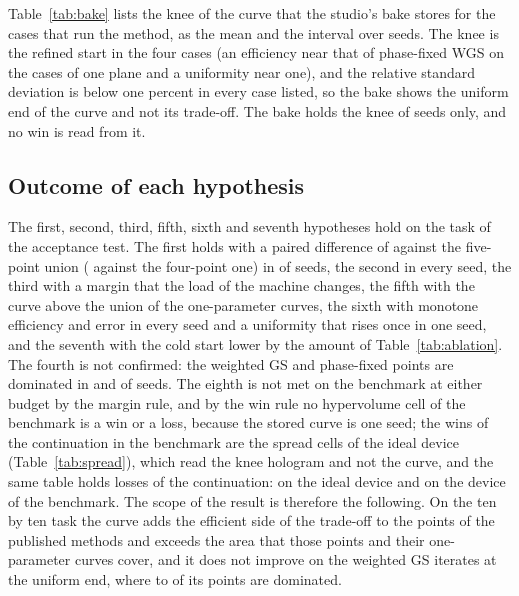 Table~\ref{tab:bake} lists the knee of the curve that the studio's bake stores for the cases that run the method, as the mean and the interval over \bakeSeeds{} seeds. The knee is the refined start in the four cases (an efficiency near that of phase-fixed WGS on the cases of one plane and a uniformity near one), and the relative standard deviation is below one percent in every case listed, so the bake shows the uniform end of the curve and not its trade-off. The bake holds the knee of \bakeSeeds{} seeds only, and no win is read from it.

\begin{table}[t]
\centering\small
\caption{Knee of the curve stored by the studio's bake for the cases that run the method: efficiency, uniformity and relative standard deviation (mean $\pm$ half-width of the 95 percent interval over \bakeSeeds{} seeds; the intervals are wide with three seeds). Source: the committed file of measured ranges.}
\label{tab:bake}

\end{table}

\subsection{Outcome of each hypothesis}\label{sec:res-outcome}

The first, second, third, fifth, sixth and seventh hypotheses hold on the task of the acceptance test. The first holds with a paired difference of \hvFiveDiff{} against the five-point union (\hvDiff{} against the four-point one) in \hvFiveGe{} of \nSeeds{} seeds, the second in every seed, the third with a margin that the load of the machine changes, the fifth with the curve above the union of the one-parameter curves, the sixth with monotone efficiency and error in every seed and a uniformity that rises once in one seed, and the seventh with the cold start lower by the amount of Table~\ref{tab:ablation}.
The fourth is not confirmed: the weighted GS and phase-fixed points are dominated in \domGSWSeeds{} and \domPFSeeds{} of \nSeeds{} seeds. The eighth is not met on the benchmark at either budget by the margin rule, and by the win rule no hypervolume cell of the benchmark is a win or a loss, because the stored curve is one seed; the wins of the continuation in the benchmark are the \spreadWins{} spread cells of the ideal device (Table~\ref{tab:spread}), which read the knee hologram and not the curve, and the same table holds losses of the continuation: \spreadLosses{} on the ideal device and \spreadDevLosses{} on the device of the benchmark. The scope of the result is therefore the following. On the ten by ten task the curve adds the efficient side of the trade-off to the points of the published methods and exceeds the area that those points and their one-parameter curves cover, and it does not improve on the weighted GS iterates at the uniform end, where
\frontDomMin{} to \frontDomMax{} of its points are dominated.
